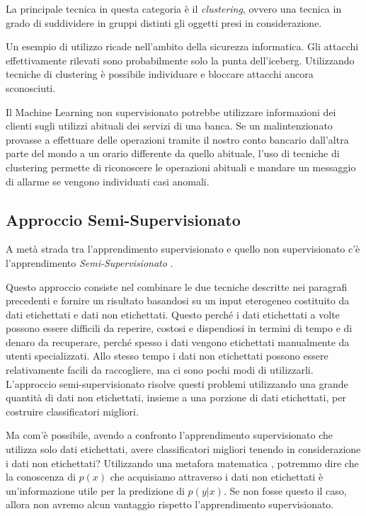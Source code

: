 \documentclass[a4paper,12pt]{report}
\begin{document}
\bigskip

La principale tecnica in questa categoria è il \textit{clustering}, ovvero una tecnica in grado di suddividere in gruppi distinti  gli oggetti presi in considerazione.

Un esempio di utilizzo ricade nell'ambito della sicurezza informatica. Gli attacchi effettivamente rilevati sono probabilmente solo la punta dell'iceberg. Utilizzando tecniche di clustering è possibile individuare e bloccare attacchi ancora sconosciuti.

Il Machine Learning non supervisionato potrebbe utilizzare informazioni dei clienti sugli utilizzi abituali dei servizi di una banca. Se un malintenzionato provasse a effettuare delle operazioni tramite il nostro conto bancario dall'altra parte del mondo a un orario differente da quello abituale, l'uso di tecniche di clustering permette di riconoscere le operazioni abituali e mandare un messaggio di allarme se vengono individuati casi anomali.

\subsection*{Approccio Semi-Supervisionato}
A metà strada tra l'apprendimento supervisionato e quello non supervisionato c'è l'apprendimento \textit{Semi-Supervisionato} \cite{supervisedlearning}.

Questo approccio consiste nel combinare le due tecniche descritte nei paragrafi precedenti e fornire un risultato basandosi su un input eterogeneo costituito da dati etichettati e dati non etichettati.
Questo perché i dati etichettati a volte possono essere difficili da reperire, costosi e dispendiosi in termini di tempo e di denaro da recuperare, perché spesso i dati vengono etichettati manualmente da utenti specializzati. Allo stesso tempo i dati non etichettati possono essere relativamente facili da raccogliere, ma ci sono pochi modi di utilizzarli. 
L'approccio semi-supervisionato risolve questi problemi utilizzando una grande quantità di dati non etichettati, insieme a una porzione di dati etichettati, per costruire classificatori migliori. 

Ma com'è possibile, avendo a confronto l'apprendimento supervisionato che utilizza solo dati etichettati, avere classificatori migliori tenendo in considerazione i dati non etichettati?
Utilizzando una metafora matematica \cite{supervisedlearning}, potremmo dire che la conoscenza di $p(x)$ che acquisiamo attraverso i dati non etichettati è un'informazione utile per la predizione di $p(y|x)$. Se non fosse questo il caso, allora non avremo alcun vantaggio rispetto l'apprendimento supervisionato.
\end{document}
